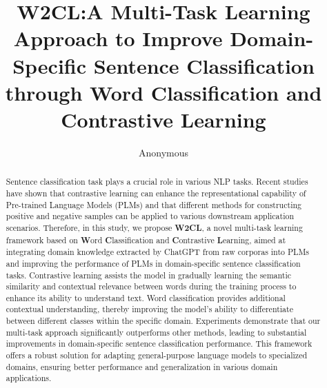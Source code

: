 \documentclass[runningheads]{llncs}
\begin{document}
%
\title{W2CL:A Multi-Task Learning Approach to Improve Domain-Specific Sentence Classification through Word Classification and Contrastive Learning}
%
%
%
\author{Anonymous}
%
%
\maketitle              %
%
\begin{abstract}
Sentence classification task plays a crucial role in various NLP tasks. Recent studies have shown that contrastive learning can enhance the representational capability of Pre-trained Language Models (PLMs) and that different methods for constructing positive and negative samples can be applied to various downstream application scenarios. Therefore, in this study, we propose \textbf{W2CL}, a novel multi-task learning framework based on \textbf{W}ord \textbf{C}lassification and \textbf{C}ontrastive \textbf{L}earning, aimed at integrating domain knowledge extracted by ChatGPT from raw corporas into PLMs and improving the performance of PLMs in domain-specific sentence classification tasks. Contrastive learning assists the model in gradually learning the semantic similarity and contextual relevance between words during the training process to enhance its ability to understand text. Word classification provides additional contextual understanding, thereby improving the model's ability to differentiate between different classes within the specific domain. Experiments demonstrate that our multi-task approach significantly outperforms other methods, leading to substantial improvements in domain-specific sentence classification performance. This framework offers a robust solution for adapting general-purpose language models to specialized domains, ensuring better performance and generalization in various domain applications.

\end{abstract}
%
%
%





%
%
%


\end{document}
